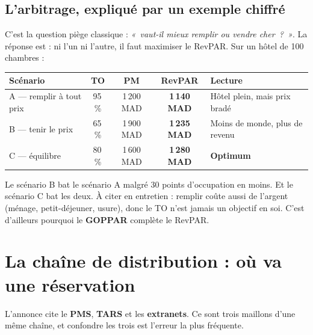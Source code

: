 \documentclass[11pt,a4paper]{article}
\newcommand{\terme}[1]{\textcolor{bleusof}{\textbf{#1}}}
\begin{document}
\subsection*{L'arbitrage, expliqué par un exemple chiffré}

C'est la question piège classique : \emph{«~vaut-il mieux remplir ou vendre cher~?~»}. La réponse est : ni l'un ni l'autre, il faut maximiser le RevPAR. Sur un hôtel de 100 chambres :

\begin{center}
\small\renewcommand{\arraystretch}{1.1}
\begin{tabular}{@{}lcccl@{}}
\toprule
\rowcolor{grisdoux}\textbf{Scénario} & \textbf{TO} & \textbf{PM} & \textbf{RevPAR} & \textbf{Lecture} \\
\midrule
A --- remplir à tout prix & 95\,\% & 1\,200 MAD & \textbf{1\,140 MAD} & Hôtel plein, mais prix bradé \\
B --- tenir le prix & 65\,\% & 1\,900 MAD & \textbf{1\,235 MAD} & Moins de monde, plus de revenu \\
C --- équilibre & 80\,\% & 1\,600 MAD & \textbf{1\,280 MAD} & \textcolor{bleusof}{\textbf{Optimum}} \\
\bottomrule
\end{tabular}
\end{center}

\noindent Le scénario B bat le scénario A malgré 30 points d'occupation en moins. Et le scénario C bat les deux. À citer en entretien : remplir coûte aussi de l'argent (ménage, petit-déjeuner, usure), donc le TO n'est jamais un objectif en soi. C'est d'ailleurs pourquoi le \terme{GOPPAR} complète le RevPAR.

\section{La chaîne de distribution : où va une réservation}

L'annonce cite le \terme{PMS}, \terme{TARS} et les \terme{extranets}. Ce sont trois maillons d'une même chaîne, et confondre les trois est l'erreur la plus fréquente.
\end{document}
